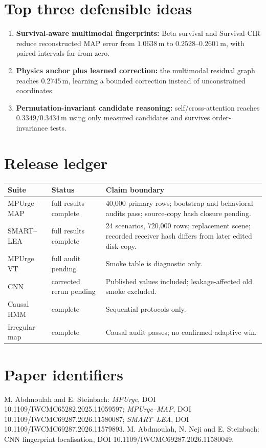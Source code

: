\documentclass[10pt,a4paper]{article}
\newcommand{\m}{\,\mathrm{m}}
\begin{document}
\section{Top three defensible ideas}
\begin{enumerate}
\item \textbf{Survival-aware multimodal fingerprints:} Beta survival and Survival-CIR reduce reconstructed MAP error from $1.0638\m$ to $0.2528$--$0.2601\m$, with paired intervals far from zero.
\item \textbf{Physics anchor plus learned correction:} the multimodal residual graph reaches $0.2745\m$, learning a bounded correction instead of unconstrained coordinates.
\item \textbf{Permutation-invariant candidate reasoning:} self/cross-attention reaches $0.3349/0.3434\m$ using only measured candidates and survives order-invariance tests.
\end{enumerate}

\section{Release ledger}
\begin{tabularx}{\linewidth}{@{}p{.21\linewidth}p{.19\linewidth}X@{}}\toprule
Suite&Status&Claim boundary\\\midrule
MPUrge--MAP&full results complete&40,000 primary rows; bootstrap and behavioral audits pass; source-copy hash closure pending.\\
SMART--LEA&full results complete&24 scenarios, 720,000 rows; replacement scene; recorded receiver hash differs from later edited disk copy.\\
MPUrge VT&full audit pending&Smoke table is diagnostic only.\\
CNN&corrected rerun pending&Published values included; leakage-affected old smoke excluded.\\
Causal HMM&complete&Sequential protocols only.\\
Irregular map&complete&Causal audit passes; no confirmed adaptive win.\\\bottomrule
\end{tabularx}

\section*{Paper identifiers}
M. Abdmoulah and E. Steinbach: \emph{MPUrge}, DOI 10.1109/IWCMC65282.2025.11059597; \emph{MPUrge--MAP}, DOI 10.1109/IWCMC69287.2026.11580087; \emph{SMART--LEA}, DOI 10.1109/IWCMC69287.2026.11579893. M. Abdmoulah, N. Neji and E. Steinbach: CNN fingerprint localisation, DOI 10.1109/IWCMC69287.2026.11580049.
\end{document}
